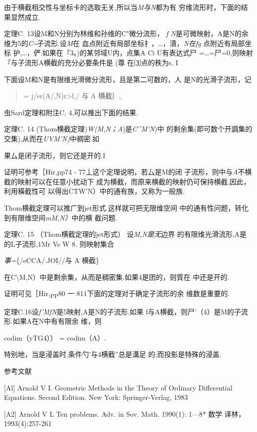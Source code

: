 \documentclass{article}
\begin{document}
由于横截相交性与坐标卡的选取无关,所以当\emph{M与N}都为有
穷维流形时，下面的结果显然成立.

定理C. 13设M和N分别为林维和孙维的C"微分流形， \emph{f
N}是可微映射，A是N的余维为5的\emph{C\textasciitilde{}}子流形.设\emph{M}在
血点附近有局部坐标扌，\ldots{}，漬，\emph{N在fg} 点附近有局部坐标
护,\ldots{}，俨.如果在『3。)的某邻域U内，点集A Ci U有表达式尸
=\ldots{}=尸=0,则映射『与子流形A横截的充分必要条件是 (尊\textbar{}
在⑶点的秩为s. I

下面设M和N是有限维光滑微分流形，且是第二可数的，人 是N的光滑子流形，记

\begin{quote}
= j/er(A/,N)\textbar{}r\textgreater{}l,/ 与 A 横截｝,
\end{quote}

虫Sard定理和附注C, 4,可以推出下面的结果.

定理C. 14 (Thom横截定理)\emph{W(M,N；A})是\emph{C\^{}M'N})中
的剩余集(即可数个开調集的交集),从而在\emph{UVM'N)}中稠密.如

果厶是闭子流形，则它还是开的.I

证明可参考［Hir,pp74 - 77丄这个定理说明，若厶是M的闭
子流形，则中与\emph{A}不横截的映射可以在任意小扰动下
成为横截，而原来横截的映射仍可保持横截,因此，利用橫截性可
以得出CTW'N）中的通有族，又称为一般族.

Thom横截定理可以推广到jet形式.这样就可把无限维空间
中的通有性问题，转化到有限维空间\emph{mM,N）}中的横 截问题.

定理C. 15 （Thom横截定理的jet形式） 设\emph{M,N是无}边界
的有限维光滑流形,A是的L子流形,1Mr Vs W 8. 则映射集合

\emph{事=}\{/eCCA/.JOI//与 A 横截\}

在C\textbackslash{}M,N）中是剩余集，从而是稠密集.如果4是团的，则質在
中还是开的.\textbar{}

证明可见［Hir,\textsubscript{PP}80 一 811下面的定理对于确定子流形的余
维数是重要的.

定理C.16设\emph{f'MfN}是5映射,A是N的子流形.如果
f与A横截，则尸'（4）是M的子流形.如果A在N中有有限余 维，则

codim（yTG4）） = codim（A）. \textbar{}

特别地，当是浸盖时,条件勺'与4横截''总是溝足 的;而投影是特殊的浸盖.

参考文献

{[}Al{]} Arnold V I. Geometric Methods in the Theory of Ordinary
Differential Equations. Second Edition. New York: Springer-Verlag, 1983

{[}A2{]} Arnold V L Ten problems. Adv. in Sov. Math. 1990(1): 1---8*
数学 译林，1993(4):257-261
\end{document}
